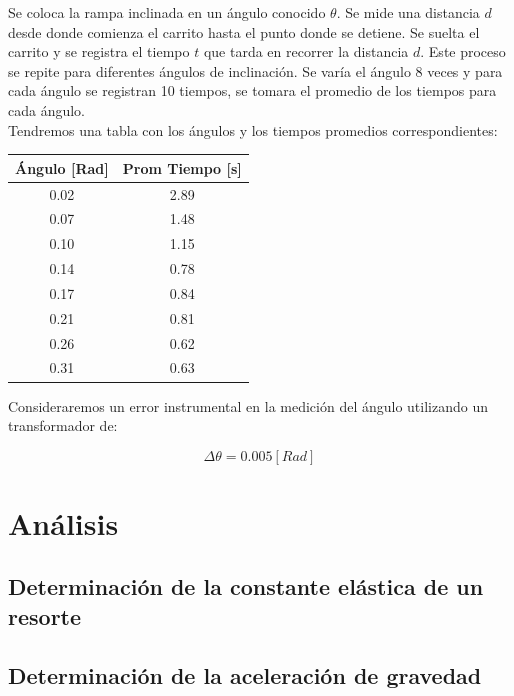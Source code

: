 \documentclass{article}
\begin{document}
\begin{multicols}{2}
    Se coloca la rampa inclinada en un ángulo conocido $\theta$. Se mide una distancia $d$ desde
    donde comienza el carrito hasta el punto donde se detiene. Se suelta el carrito y se registra
    el tiempo $t$ que tarda en recorrer la distancia $d$. Este proceso se repite para diferentes
    ángulos de inclinación. Se varía el ángulo 8 veces y para cada ángulo se registran 10 tiempos,
    se tomara el promedio de los tiempos para cada ángulo.
    \\ Tendremos una tabla con los ángulos y los tiempos promedios correspondientes:

    \begin{center}
        \begin{tabular}{|c|c|}
            \hline
            Ángulo [Rad] & Prom Tiempo [s] \\
            \hline
            0.02 & 2.89 \\
            0.07 & 1.48 \\
            0.10 & 1.15 \\
            0.14 & 0.78 \\
            0.17 & 0.84 \\
            0.21 & 0.81 \\
            0.26 & 0.62 \\
            0.31 & 0.63 \\
            \hline
        \end{tabular}
    \end{center}

    Consideraremos un error instrumental en la medición del ángulo utilizando un transformador 
    de: 
        
        \begin{equation}
            \Delta \theta = 0.005 [Rad]
        \end{equation}

\section{Análisis}

    \subsection{Determinación de la constante elástica de un resorte}



    \subsection{Determinación de la aceleración de gravedad}


\end{multicols}
\end{document}
